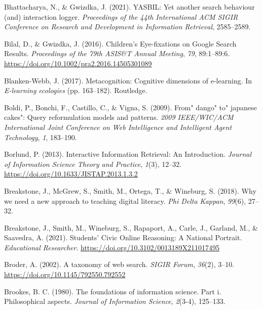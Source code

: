 \documentclass[letterpaper, nobind]{templates/ociamthesis}
\newlength{\cslhangindent}
\newenvironment{CSLReferences}[2] %
 {%
  \setlength{\parindent}{0pt}
  \ifodd #1
  \let\oldpar\par
  \def\par{\hangindent=\cslhangindent\oldpar}
  \fi
  \setlength{\parskip}{1mm}
  \setlength{\baselineskip}{6mm}
 }%
 {}
\begin{document}
\begin{CSLReferences}{1}{0}
\leavevmode{}%
Bhattacharya, N., \& Gwizdka, J. (2021). YASBIL: Yet another search behaviour (and) interaction logger. \emph{Proceedings of the 44th International ACM SIGIR Conference on Research and Development in Information Retrieval}, 2585--2589.

\leavevmode{}%
Bilal, D., \& Gwizdka, J. (2016). Children's {Eye}-fixations on {Google Search Results}. \emph{Proceedings of the 79th {ASIS}\&{T Annual Meeting}}, \emph{79}, 89:1--89:6. \url{https://doi.org/10.1002/pra2.2016.14505301089}

\leavevmode{}%
Blanken-Webb, J. (2017). Metacognition: Cognitive dimensions of e-learning. In \emph{E-learning ecologies} (pp. 163--182). Routledge.

\leavevmode{}%
Boldi, P., Bonchi, F., Castillo, C., \& Vigna, S. (2009). From" dango" to" japanese cakes": Query reformulation models and patterns. \emph{2009 IEEE/WIC/ACM International Joint Conference on Web Intelligence and Intelligent Agent Technology}, \emph{1}, 183--190.

\leavevmode{}%
Borlund, P. (2013). Interactive {Information Retrieval}: {An Introduction}. \emph{Journal of Information Science Theory and Practice}, \emph{1}(3), 12--32. \url{https://doi.org/10.1633/JISTAP.2013.1.3.2}

\leavevmode{}%
Breakstone, J., McGrew, S., Smith, M., Ortega, T., \& Wineburg, S. (2018). Why we need a new approach to teaching digital literacy. \emph{Phi Delta Kappan}, \emph{99}(6), 27--32.

\leavevmode{}%
Breakstone, J., Smith, M., Wineburg, S., Rapaport, A., Carle, J., Garland, M., \& Saavedra, A. (2021). Students' {Civic Online Reasoning}: A {National Portrait}. \emph{Educational Researcher}. \url{https://doi.org/10.3102/0013189X211017495}

\leavevmode{}%
Broder, A. (2002). A taxonomy of web search. \emph{SIGIR Forum}, \emph{36}(2), 3--10. \url{https://doi.org/10.1145/792550.792552}

\leavevmode{}%
Brookes, B. C. (1980). The foundations of information science. Part i. Philosophical aspects. \emph{Journal of Information Science}, \emph{2}(3-4), 125--133.


\end{CSLReferences}
\end{document}
